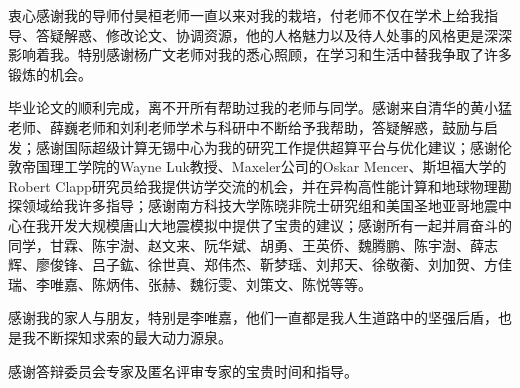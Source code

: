 \begin{acknowledgement}

衷心感谢我的导师付昊桓老师一直以来对我的栽培，付老师不仅在学术上给我指导、答疑解惑、修改论文、协调资源，他的人格魅力以及待人处事的风格更是深深影响着我。特别感谢杨广文老师对我的悉心照顾，在学习和生活中替我争取了许多锻炼的机会。

毕业论文的顺利完成，离不开所有帮助过我的老师与同学。感谢来自清华的黄小猛老师、薛巍老师和刘利老师学术与科研中不断给予我帮助，答疑解惑，鼓励与启发；感谢国际超级计算无锡中心为我的研究工作提供超算平台与优化建议；感谢伦敦帝国理工学院的Wayne Luk教授、Maxeler公司的Oskar Mencer、斯坦福大学的Robert Clapp研究员给我提供访学交流的机会，并在异构高性能计算和地球物理勘探领域给我许多指导；感谢南方科技大学陈晓非院士研究组和美国圣地亚哥地震中心在我开发大规模唐山大地震模拟中提供了宝贵的建议；感谢所有一起并肩奋斗的同学，甘霖、陈宇澍、赵文来、阮华斌、胡勇、王英侨、魏腾鹏、陈宇澍、薛志辉、廖俊锋、吕子鈜、徐世真、郑伟杰、靳梦瑶、刘邦天、徐敬蘅、刘加贺、方佳瑞、李唯嘉、陈炳伟、张赫、魏衍雯、刘策文、陈悦等等。

感谢我的家人与朋友，特别是李唯嘉，他们一直都是我人生道路中的坚强后盾，也是我不断探知求索的最大动力源泉。

感谢答辩委员会专家及匿名评审专家的宝贵时间和指导。
\end{acknowledgement}
